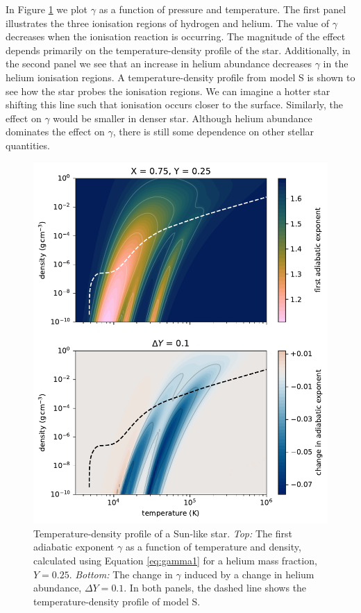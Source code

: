 In Figure \ref{fig:gamma-temp-density} we plot \(\gamma\) as a function of pressure and temperature. The first panel illustrates the three ionisation regions of hydrogen and helium. The value of \(\gamma\) decreases when the ionisation reaction is occurring. The magnitude of the effect depends primarily on the temperature-density profile of the star. Additionally, in the second panel we see that an increase in helium abundance decreases \(\gamma\) in the helium ionisation regions. A temperature-density profile from model S is shown to see how the star probes the ionisation regions. We can imagine a hotter star shifting this line such that ionisation occurs closer to the surface. Similarly, the effect on \(\gamma\) would be smaller in denser star. Although helium abundance dominates the effect on \(\gamma\), there is still some dependence on other stellar quantities.

\begin{figure}
    \centering
    \includegraphics{figures/adiabatic-ionisation-temp.pdf}
    \caption{Temperature-density profile of a Sun-like star. \emph{Top:} The first adiabatic exponent \(\gamma\) as a function of temperature and density, calculated using Equation \ref{eq:gamma1} for a helium mass fraction, \(Y=0.25\). \emph{Bottom:} The change in \(\gamma\) induced by a change in helium abundance, \(\Delta Y = 0.1\). In both panels, the dashed line shows the temperature-density profile of model S.}
    \label{fig:gamma-temp-density}
\end{figure}

